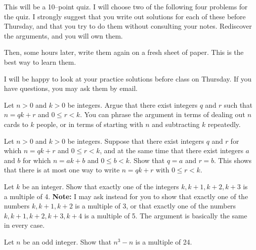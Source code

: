 
This will be a 10--point quiz.
I will choose two of the following four problems for the quiz.
I strongly suggest that you write out solutions for each of these before Thursday, and that you try to do them without consulting your notes.
Rediscover the arguments, and you will own them.

Then, some hours later, write them again on a fresh sheet of paper.
This is the best way to learn them.

I will be happy to look at your practice solutions before class on Thursday.
If you have questions, you may ask them by email.

\blist{0.5in}
\item Let $n > 0$ and $k > 0$ be integers.
Argue that there exist integers $q$ and $r$ such that $n = qk + r$ and $0 \leq r < k$.
You can phrase the argument in terms of dealing out $n$ cards to $k$ people, or in terms of starting with $n$ and subtracting $k$ repeatedly.

\item Let $n > 0$ and $k > 0$ be integers.
Suppose that there exist integers $q$ and $r$ for which $n = qk + r$ and $0 \leq r < k$, and at the same time that there exist integers $a$ and $b$ for which $n = ak + b$ and $0 \leq b < k$.
Show that $q = a$ and $r = b$.
This shows that there is at most one way to write $n = qk + r$ with $0 \leq r < k$.

\item Let $k$ be an integer.
Show that exactly one of the integers $k, k+1, k+2, k+3$ is a multiple of 4.
{\bf Note:} I may ask instead for you to show that exactly one of the numbers $k, k+1, k+2$ is a multiple of 3, or that exactly one of the numbers $k, k+1, k+2, k+3, k+4$ is a multiple of 5.  The argument is basically the same in every case.

\item Let $n$ be an odd integer.
Show that $n^3 - n$ is a multiple of 24.

\elist

\vfill          %
